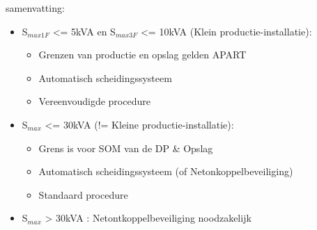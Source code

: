 \documentclass[12pt]{article}
\begin{document}
\begin{itemize}
    samenvatting:\begin{itemize}
        \item S$_{max1F}$ <= 5kVA en S$_{max3F}$ <= 10kVA (Klein productie-installatie):\begin{itemize}
            \item Grenzen van productie en opslag gelden APART 
            \item Automatisch scheidingssysteem
            \item Vereenvoudigde procedure
        \end{itemize}
        \item S$_{max}$ <= 30kVA (!= Kleine productie-installatie):\begin{itemize}
            \item Grens is voor SOM van de DP \& Opslag 
            \item Automatisch scheidingssysteem (of Netonkoppelbeveiliging)
            \item Standaard procedure
        \end{itemize}
        \item S$_{max}$ > 30kVA : Netontkoppelbeveiliging noodzakelijk
    \end{itemize}
\end{itemize}
\end{document}
